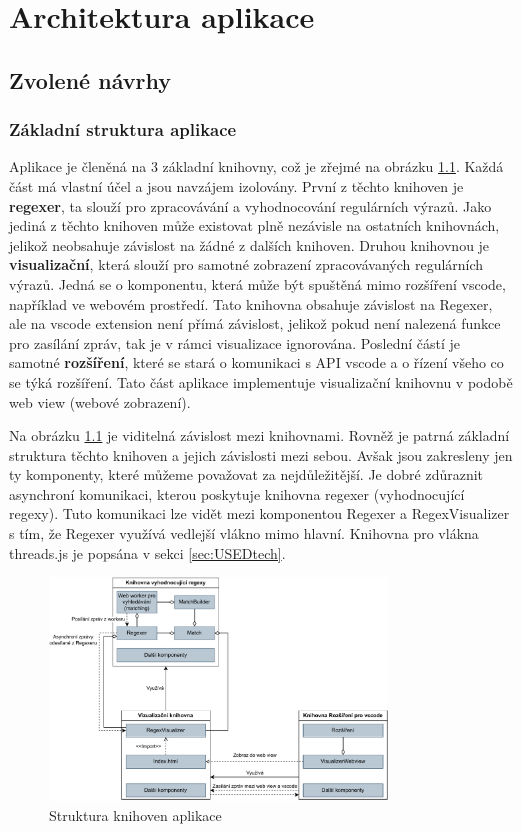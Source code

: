 \chapter{Architektura aplikace}\label{sec:Principle}

\section{Zvolené návrhy}

\subsection*{Základní struktura aplikace}

Aplikace je členěná na 3 základní knihovny, což je zřejmé na obrázku \ref{fig:ARCH}.
Každá část má vlastní účel a jsou navzájem izolovány.
První z těchto knihoven je \textbf{regexer}, ta slouží pro zpracovávání a vyhodnocování regulárních výrazů.
Jako jediná z těchto knihoven může existovat plně nezávisle na ostatních knihovnách, jelikož neobsahuje závislost na žádné z dalších knihoven.
Druhou knihovnou je \textbf{visualizační}, která slouží pro samotné zobrazení zpracovávaných regulárních výrazů.
Jedná se o komponentu, která může být spuštěná mimo rozšíření vscode, například ve webovém prostředí.
Tato knihovna obsahuje závislost na Regexer, ale na vscode extension není přímá závislost, jelikož pokud není nalezená funkce pro zasílání zpráv, tak je v rámci visualizace ignorována.
Poslední částí je samotné \textbf{rozšíření}, které se stará o komunikaci s API vscode a o řízení všeho co se týká rozšíření.
Tato část aplikace implementuje visualizační knihovnu v podobě web view (webové zobrazení).

Na obrázku \ref{fig:ARCH} je viditelná závislost mezi knihovnami. 
Rovněž je patrná základní struktura těchto knihoven a jejich závislosti mezi sebou.
Avšak jsou zakresleny jen ty komponenty, které můžeme považovat za nejdůležitější. 
Je dobré zdůraznit asynchroní komunikaci, kterou poskytuje knihovna regexer (vyhodnocující regexy).
Tuto komunikaci lze vidět mezi komponentou Regexer a RegexVisualizer s tím, že Regexer využívá vedlejší vlákno mimo hlavní. 
Knihovna pro vlákna threads.js je popsána v sekci \ref{sec:USEDtech}.

\begin{figure}[!h]
	\centering
	\includegraphics[width=0.8\textwidth]{Figures/BP-Arch.pdf}
	\caption{Struktura knihoven aplikace}
	\label{fig:ARCH}
\end{figure}

